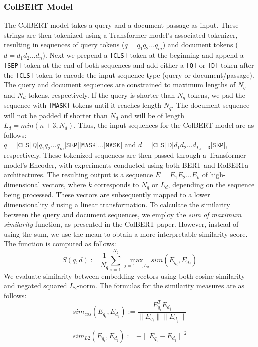 \documentclass[11pt]{article}
\begin{document}
\subsubsection{ColBERT Model}
The ColBERT model takes a query and a document passage as input. These strings are then tokenized using a Transformer model's associated tokenizer, resulting in sequences of query tokens ($q = q_1q_2\dots q_m$) and document tokens ($d = d_1d_2\dots d_n$). Next we prepend a \texttt{[CLS]} token at the beginning and append a \texttt{[SEP]} token at the end of both sequences and add either a \texttt{[Q]} or \texttt{[D]} token after the \texttt{[CLS]} token to encode the input sequence type (query or document/passage). The query and document sequences are constrained to maximum lengths of $N_q$ and $N_d$ tokens, respectively. If the query is shorter than $N_q$ tokens, we pad the sequence with \texttt{[MASK]} tokens until it reaches length $N_q$. The document sequence will not be padded if shorter than $N_d$ and will be of length $L_d = min(n + 3, N_d)$. Thus, the input sequences for the ColBERT model are as follows: \\ $q = \texttt{[CLS]}\texttt{[Q]}q_1q_2 \dots q_m\texttt{[SEP]}\texttt{[MASK]}\dots\texttt{[MASK]}$ and $d = \texttt{[CLS]}\texttt{[D]}d_1d_2 \dots d_{L_d-3}\texttt{[SEP]}$, respectively. These tokenized sequences are then passed through a Transformer model's Encoder, with experiments conducted using both BERT \cite{devlin2019bert} and RoBERTa \cite{liu2019roberta} architectures. The resulting output is a sequence $E = E_1E_2 \dots E_k$ of high-dimensional vectors, where $k$ corresponds to $N_q$ or $L_d$, depending on the sequence being processed. These vectors are subsequently mapped to a lower dimensionality $d$ using a linear transformation. To calculate the similarity between the query and document sequences, we employ the \textit{sum of maximum similarity} function, as presented in the ColBERT paper. However, instead of using the sum, we use the mean to obtain a more interpretable similarity score. The function is computed as follows:
$$ S(q,d) := \frac{1}{N_q} \sum_{i=1}^{N_q} \max_{j = 1, \dots, L_d} sim(E_{q_i}, E_{d_j})
$$
We evaluate similarity between embedding vectors using both cosine similarity and negated squared $L_2$-norm. The formulas for the similarity measures are as follows:
$$
sim_{cos}(E_{q_i}, E_{d_j}) := \frac{E_{q_i}^{T}E_{d_j} }{\| E_{q_i} \|\| E_{d_j} \|} 
$$

$$
sim_{L2}(E_{q_i}, E_{d_j}) := -{\| E_{q_i} -E_{d_j} \|}^2
$$
\end{document}
